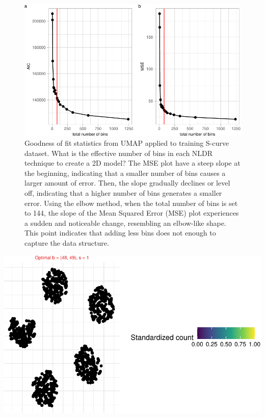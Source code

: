 \documentclass[
  12pt]{article}
\begin{document}
\begin{figure}

{\centering \includegraphics{paper_files/figure-pdf/fig-diagnosticpltPBMC-1.pdf}

}

\caption{\label{fig-diagnosticpltPBMC}Goodness of fit statistics from
UMAP applied to training S-curve dataset. What is the effective number
of bins in each NLDR technique to create a 2D model? The MSE plot have a
steep slope at the beginning, indicating that a smaller number of bins
causes a larger amount of error. Then, the slope gradually declines or
level off, indicating that a higher number of bins generates a smaller
error. Using the elbow method, when the total number of bins is set to
144, the slope of the Mean Squared Error (MSE) plot experiences a sudden
and noticeable change, resembling an elbow-like shape. This point
indicates that adding less bins does not enough to capture the data
structure.}

\end{figure}

\includegraphics{paper_files/figure-pdf/unnamed-chunk-59-1.pdf}
\end{document}
